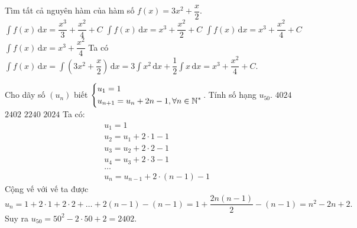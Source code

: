 \begin{ex}%
	Tìm tất cả nguyên hàm của hàm số $f(x) = 3x^2 + \dfrac{x}{2}$.
	\choice
		{$\displaystyle \int f(x) \mathrm{\,d}x = \dfrac{x^3}{3} + \dfrac{x^2}{4} + C$}
		{$\displaystyle \int f(x) \mathrm{\,d}x = x^3 + \dfrac{x^2}{2} + C$}
		{\True $\displaystyle \int f(x) \mathrm{\,d}x = x^3 + \dfrac{x^2}{4} + C$}
		{$\displaystyle \int f(x) \mathrm{\,d}x = x^3 + \dfrac{x^2}{4}$}
	\loigiai
		{
			Ta có $\displaystyle \int f(x) \mathrm{\,d}x = \displaystyle \int \left(3x^2+\dfrac{x}{2}\right) \mathrm{\,d}x = 3 \displaystyle \int x^2 \mathrm{\,d}x + \dfrac{1}{2} \displaystyle \int x \mathrm{\,d}x  = x^3 + \dfrac{x^2}{4} + C$.
		}
\end{ex}

\begin{ex}%
	Cho dãy số $\left(u_n\right)$ biết $\left\{\begin{aligned}
		& u_1=1 \\ 
		& {u}_{n+1}=u_n+2n-1,\forall n\in {\mathbb{N}}^{*}\end{aligned}\right.$. Tính số hạng $u_{50}$.
	\choice
		{$4024$}
		{\True $2402$}
		{$2240$}
		{$2024$}
	\loigiai
		{
			Ta có:
			\begin{align*}
			&u_{1}=1\\
			&u_{2}=u_{1}+2 \cdot 1-1\\
			&u_{3}=u_{2}+2 \cdot 2-1\\
			&u_{4}=u_{3}+2 \cdot 3-1\\
			&\ldots\\
			&u_{n}=u_{n-1}+2 \cdot (n-1)-1
			\end{align*}
			Cộng vế với vế ta được
			\[u_{n}=1+2 \cdot 1+2 \cdot 2+ \ldots+ 2(n-1)-(n-1)= 1+ \dfrac{2n(n-1)}{2}-(n-1)= n^2-2n+2.\]
			Suy ra $u_{50}= 50^2-2 \cdot 50+2= 2402$.
		}
\end{ex}

